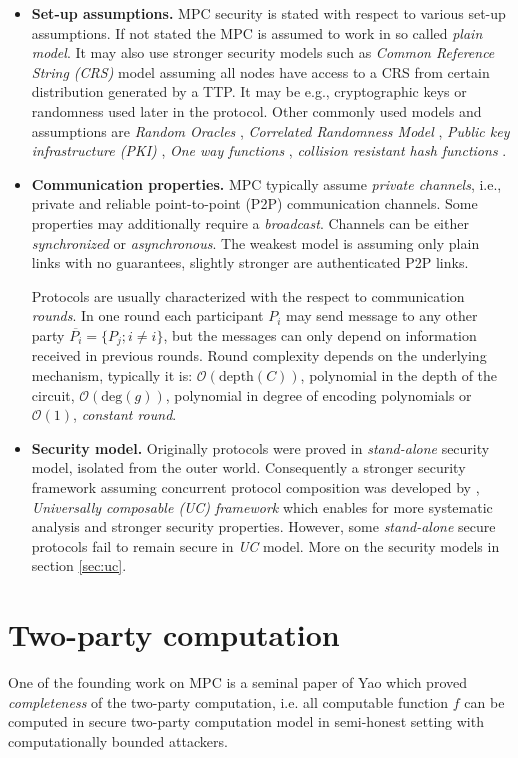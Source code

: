 \documentclass[
  digital, %
  twoside, %
  table,   %
  lof,     %
  lot,     %
]{fithesis3}
\newcommand{\itembf}[1]{\item {\bf{#1}}}
\newcommand{\bigO}[0]{\mathcal{O}}
\begin{document}
\begin{itemize}
    \itembf{Set-up assumptions.} MPC security is stated with respect to various set-up assumptions. If not stated the MPC is assumed to work in so called \emph{plain model}. It may also use stronger security models such as \emph{Common Reference String (CRS)} model \cite{CF01,DN02} assuming all nodes have access to a CRS from certain distribution generated by a TTP. It may be e.g., cryptographic keys or randomness used later in the protocol. Other commonly used models and assumptions are \emph{Random Oracles} \cite{HM04}, \emph{Correlated Randomness Model} \cite{FGMR02, FWW04, IKMOP13}, \emph{Public key infrastructure (PKI)} \cite{BCNP04}, \emph{One way functions} \cite{IL89, KL07}, \emph{collision resistant hash functions} \cite{KL07, GMS08}.
    
    \itembf{Communication properties.} MPC typically assume \emph{private channels}, i.e., private and reliable point-to-point (P2P) communication channels. Some properties may additionally require a \emph{broadcast}. Channels can be either \emph{synchronized} or \emph{asynchronous}. The weakest model is assuming only plain links with no guarantees, slightly stronger are authenticated P2P links.
    
    Protocols are usually characterized with the respect to communication \emph{rounds}. In one round each participant $P_i$ may send message to any other party $\overline{P_i} = \{P_j; i \neq i\}$, but the messages can only depend on information received in previous rounds. Round complexity depends on the underlying mechanism, typically it is: $\bigO(\text{depth}(C))$, polynomial in the depth of the circuit, $\bigO(\text{deg}(g))$, polynomial in degree of encoding polynomials or $\bigO(1)$, \emph{constant round}.
    
    \itembf{Security model.} Originally protocols were proved in \emph{stand-alone} security model, isolated from the outer world. Consequently a stronger security framework assuming concurrent protocol composition was developed by \cite{Can01}, \emph{Universally composable (UC) framework} which enables for more systematic analysis and stronger security properties. However, some \emph{stand-alone} secure protocols fail to remain secure in \emph{UC} model. More on the security models in section \ref{sec:uc}.
    
\end{itemize}

\section{Two-party computation} %
One of the founding work on MPC is a seminal paper of Yao \cite{Yao86} which proved \emph{completeness} of the two-party computation, i.e. all computable function $f$ can be computed in secure two-party computation model in semi-honest setting with computationally bounded attackers. 
\end{document}

